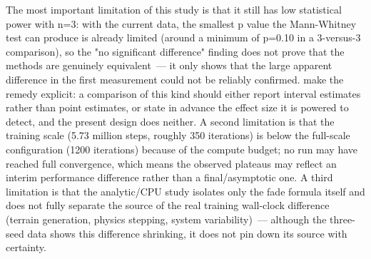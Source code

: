 The most important limitation of this study is that it still has low statistical power with n=3: with the current data, the smallest p value the Mann-Whitney test can produce is already limited (around a minimum of p=0.10 in a 3-versus-3 comparison), so the "no significant difference" finding does not prove that the methods are genuinely equivalent~--- it only shows that the large apparent difference in the first measurement could not be reliably confirmed. \citet{colas2019} make the remedy explicit: a comparison of this kind should either report interval estimates rather than point estimates, or state in advance the effect size it is powered to detect, and the present design does neither. A second limitation is that the training scale (5.73 million steps, roughly 350 iterations) is below the full-scale configuration (1200 iterations) because of the compute budget; no run may have reached full convergence, which means the observed plateaus may reflect an interim performance difference rather than a final/asymptotic one. A third limitation is that the analytic/CPU study isolates only the fade formula itself and does not fully separate the source of the real training wall-clock difference (terrain generation, physics stepping, system variability)~--- although the three-seed data shows this difference shrinking, it does not pin down its source with certainty.

